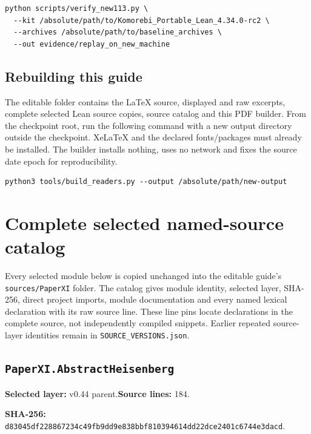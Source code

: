 \documentclass[10pt,oneside]{book}
\begin{document}
\begin{Verbatim}[fontsize=\small,breaklines=true,breakanywhere=true]
python scripts/verify_new113.py \
  --kit /absolute/path/to/Komorebi_Portable_Lean_4.34.0-rc2 \
  --archives /absolute/path/to/baseline_archives \
  --out evidence/replay_on_new_machine
\end{Verbatim}

\section{Rebuilding this guide}
The editable folder contains the LaTeX source, displayed and raw excerpts, complete selected Lean source copies, source catalog and this PDF builder. From the checkpoint root, run the following command with a new output directory outside the checkpoint. XeLaTeX and the declared fonts/packages must already be installed. The builder installs nothing, uses no network and fixes the source date epoch for reproducibility.

\begin{Verbatim}[fontsize=\small,breaklines=true]
python3 tools/build_readers.py --output /absolute/path/new-output
\end{Verbatim}

\appendix\chapter{Complete selected named-source catalog}\label{guide:catalog}

Every selected module below is copied unchanged into the editable guide's \texttt{sources/PaperXI} folder. The catalog gives module identity, selected layer, SHA-256, direct project imports, module documentation and every named lexical declaration with its raw source line. These line pins locate declarations in the complete source, not independently compiled snippets. Earlier repeated source-layer identities remain in \texttt{SOURCE\_VERSIONS.json}.

\section{\texorpdfstring{\nolinkurl{PaperXI.AbstractHeisenberg}}{PaperXI.AbstractHeisenberg}}\label{module:PaperXI.AbstractHeisenberg}

\textbf{Selected layer:} v0.44 parent.\quad\textbf{Source lines:} 184.\par\textbf{SHA-256:} {\scriptsize\nolinkurl{d83045df228867234c49fb9dd9e838bbf810394614dd22dce2401c6744e3dacd}}.
\end{document}
